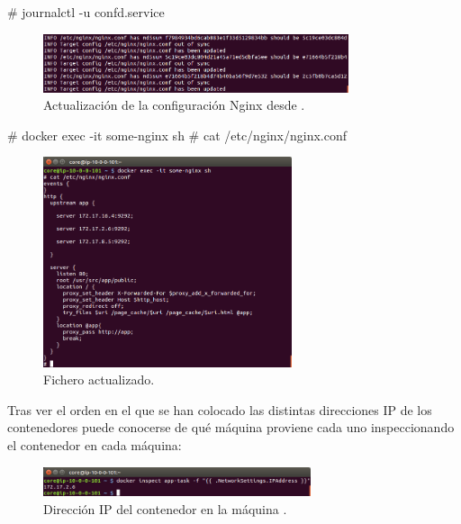 \begin{code}
# journalctl -u confd.service
\end{code}

\begin{figure}[H]
\centering
\includegraphics[width=0.8\textwidth]{images/figures/update-journal-confd.png}
\caption{Actualización de la configuración Nginx desde .}
\end{figure}

\begin{code}
# docker exec -it some-nginx sh
# cat /etc/nginx/nginx.conf
\end{code}

\begin{figure}[H]
\centering
\includegraphics[width=0.65\textwidth]{images/figures/update-nginx-confd.png}
\caption{Fichero  actualizado.}
\end{figure}

Tras ver el orden en el que se han colocado las distintas direcciones IP de los contenedores  puede conocerse de qué máquina proviene cada uno inspeccionando el contenedor en cada máquina:


\begin{figure}[H]
\centering
\includegraphics[width=0.7\textwidth]{images/figures/IP1-confd.png}
\caption{Dirección IP del contenedor  en la máquina .}
\end{figure}

